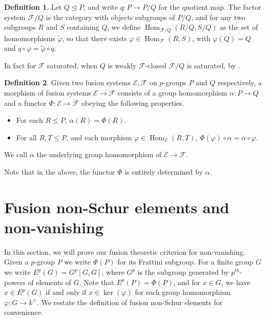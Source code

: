 \documentclass{amsart}
\theoremstyle{plain}\newtheorem{theorem}{Theorem}[section]
\theoremstyle{plain}\newtheorem{conjecture}[theorem]{Conjecture}
\theoremstyle{plain}\newtheorem{corollary}[theorem]{Corollary}
\theoremstyle{plain}\newtheorem{lemma}[theorem]{Lemma}
\theoremstyle{plain}\newtheorem{proposition}[theorem]{Proposition}
\theoremstyle{plain}\newtheorem{statement}[theorem]{}
\theoremstyle{definition}\newtheorem{definition}[theorem]{Definition}
\theoremstyle{definition}\newtheorem{example}[theorem]{Example}
\theoremstyle{definition}\newtheorem{examples}[theorem]{Examples}
\theoremstyle{definition}\newtheorem{notation}[theorem]{Notation}
\theoremstyle{definition}\newtheorem{remark}[theorem]{Remark}
\theoremstyle{definition}\newtheorem{remarks}[theorem]{Remarks}
\theoremstyle{definition}\newtheorem{question}[theorem]{Question}
\theoremstyle{definition}\newtheorem{propositiondefinition}[theorem]{Definition/Proposition}
\DeclareMathOperator{\Hom}{Hom}
\renewcommand{\phi}{\varphi}
\newcommand{\F}{\mathcal{F}}
\begin{document}
 \begin{definition}\cite[Definition 5.9]{Craven}
    Let $Q \trianglelefteq P$, and write $q: P \rightarrow P/Q$ for the quotient map. The factor system $\mathcal{F}/Q$ is the category with objects subgroups of $P/Q$, and for any two subgroups $R$ and $S$ containing $Q$, we define $\Hom_{\F/Q}(R/Q, S/Q)$ as the set of homomorphisms $\tilde\phi$, so that there exists $\phi \in \Hom_\F( R, S)$, with $\phi(Q) = Q$ and $q \circ \phi = \tilde \phi \circ q$. 
 \end{definition}
 In fact for $\mathcal{F}$ saturated, when $Q$ is weakly $\mathcal{F}$-closed $\mathcal{F}/Q$ is saturated, by \cite[Proposition 5.10]{Craven}.
 \begin{definition}\cite[Definition 5.1]{Craven}
    Given two fusion systems $\mathcal{E}, \mathcal{F}$ on $p$-groups $P$ and $Q$ respectively, a morphism of fusion systems $ \mathcal{E} \rightarrow \mathcal{F}$ consists of a group homomorphism $\alpha: P \rightarrow Q$ and a functor $\Phi:\mathcal{E} \rightarrow \mathcal{F}$ obeying the following properties.
    \begin{itemize}
        \item For each $R \leq P$, $\alpha(R) = \Phi(R)$. 
        \item For all  $R, T \leq P$, and each morphism $\phi \in \Hom_{\mathcal{E}}(R,T)$, $\Phi(\phi) \circ \alpha = \alpha \circ \phi$.
    \end{itemize}
    We call $\alpha$ the underlying group homomorphism of $\mathcal{E} \rightarrow \mathcal{F}$.
 \end{definition}
 Note that in the above, the functor $\Phi$ is entirely determined by $\alpha$. 


 
 \section{Fusion non-Schur elements and non-vanishing}
In this section, we will prove our fusion theoretic criterion for non-vanishing.  Given a $p$-group $P$ we write $\Phi(P)$ for its Frattini subgroup. For a finite group $G$ we write $E^p(G) = G^p[G,G]$, where $G^p$ is the subgroup generated by $p^{th}$-powers of elements of $G$. Note that $E^p(P) = \Phi(P)$, and for $x \in G$, we have $x \in E^p(G)$ if and only if $x \in \operatorname{ker}(\varphi)$ for each group homomorphism $\varphi:G \rightarrow k^+$. We restate the definition of fusion non-Schur elements for convenience.
\end{document}
